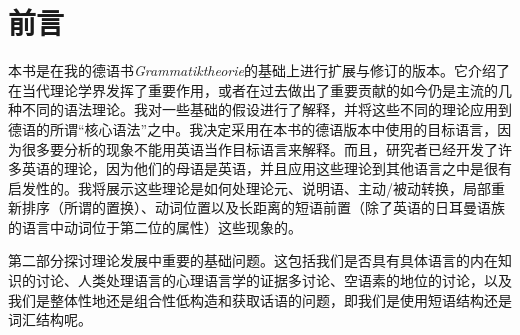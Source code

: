 \chapter{前言}

本书是在我的德语书\emph{Grammatiktheorie}\citep{MuellerGTBuch2}的基础上进行扩展与修订的版本。它介绍了在当代理论学界发挥了重要作用，或者在过去做出了重要贡献的如今仍是主流的几种不同的语法理论。我对一些基础的假设进行了解释，并将这些不同的理论应用到德语的所谓“核心语法”之中。我决定采用在本书的德语版本中使用的目标语言，因为很多要分析的现象不能用英语当作目标语言来解释。而且，研究者已经开发了许多英语的理论，因为他们的母语是英语，并且应用这些理论到其他语言之中是很有启发性的。我将展示这些理论是如何处理论元、说明语、主动/被动转换，局部重新排序（所谓的置换）、动词位置以及长距离的短语前置（除了英语的日耳曼语族的语言中动词位于第二位的属性）这些现象的。

第二部分探讨理论发展中重要的基础问题。这包括我们是否具有具体语言的内在知识的讨论、人类处理语言的心理语言学的证据多讨论、空语素的地位的讨论，以及我们是整体性地还是组合性低构造和获取话语的问题，即我们是使用短语结构还是词汇结构呢。

